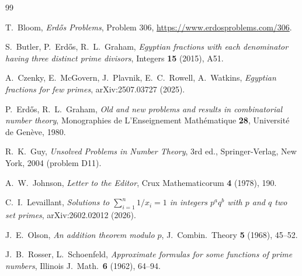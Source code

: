 \documentclass[11pt]{amsart}
\theoremstyle{plain}
\theoremstyle{definition}
\begin{document}
\begin{thebibliography}{99}

T.~Bloom, \emph{Erd\H{o}s Problems}, Problem 306,
\url{https://www.erdosproblems.com/306}.

S.~Butler, P.~Erd\H{o}s, R.~L.~Graham,
\emph{Egyptian fractions with each denominator having three distinct prime
divisors}, Integers \textbf{15} (2015), A51.

A.~Czenky, E.~McGovern, J.~Plavnik, E.~C.~Rowell, A.~Watkins,
\emph{Egyptian fractions for few primes}, arXiv:2507.03727 (2025).

P.~Erd\H{o}s, R.~L.~Graham,
\emph{Old and new problems and results in combinatorial number theory},
Monographies de L'Enseignement Math\'ematique \textbf{28},
Universit\'e de Gen\`eve, 1980.

R.~K.~Guy, \emph{Unsolved Problems in Number Theory}, 3rd ed.,
Springer-Verlag, New York, 2004 (problem D11).

A.~W.~Johnson, \emph{Letter to the Editor},
Crux Mathematicorum \textbf{4} (1978), 190.

C.~I.~Levaillant, \emph{Solutions to $\sum_{i=1}^n 1/x_i=1$ in integers
$p^aq^b$ with $p$ and $q$ two set primes}, arXiv:2602.02012 (2026).

J.~E.~Olson, \emph{An addition theorem modulo $p$},
J.\ Combin.\ Theory \textbf{5} (1968), 45--52.

J.~B.~Rosser, L.~Schoenfeld,
\emph{Approximate formulas for some functions of prime numbers},
Illinois J.\ Math.\ \textbf{6} (1962), 64--94.

\end{thebibliography}
\end{document}
